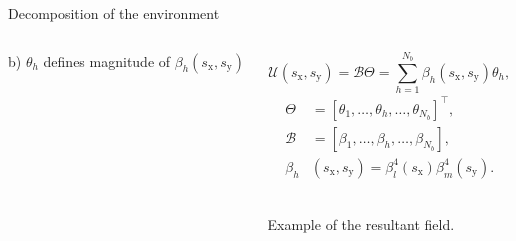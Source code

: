 \documentclass[mathserif,11pt]{beamer}
\begin{document}
\begin{frame}{Decomposition of the environment}
\begin{columns}
\begin{column}{0.4\textwidth}
	\footnotesize{b) $\theta_h$ defines magnitude of $\beta_h (s_{\mathrm{x}}, s_{\mathrm{y}})$}
\end{column}
\begin{column}{0.5\textwidth}
	\centering
	\vspace{-0.5cm}
	\begin{equation*}\label{eq_field}
	\mathcal{U}(s_{\mathrm{x}}, s_{\mathrm{y}}) = \mathcal{B}\Theta = \sum_{h=1}^{N_b}\beta_h(s_{\mathrm{x}}, s_{\mathrm{y}})\theta_h,
	\end{equation*}
	\vspace{-0.5cm}
	\begin{subequations}
		\begin{eqnarray*}
		\Theta &= \left[\theta_1,\dots,\theta_h,\dots,\theta_{N_b}\right]^{\top},\\
		\mathcal{B} &= \left[\beta_1,\dots,\beta_h,\dots,\beta_{N_b}\right],\\
		\beta_h &(s_{\mathrm{x}}, s_{\mathrm{y}}) = \beta^{4}_{l}(s_{\mathrm{x}})\beta^{4}_{m}(s_{\mathrm{y}}).
		\end{eqnarray*}
	\end{subequations}

	\vfil
	\vspace{0.3cm}
	\\
	\footnotesize{Example of the resultant field.}
\end{column}	
\end{columns}
\end{frame}
\end{document}
